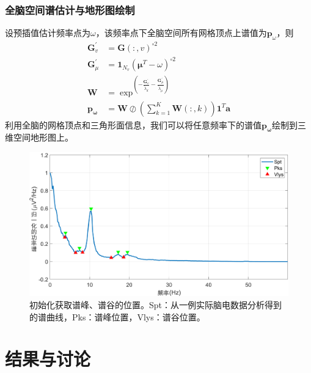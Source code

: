 \subsubsection{全脑空间谱估计与地形图绘制}
设预插值估计频率点为$\omega$，该频率点下全脑空间所有网格顶点上谱值为$\mathbf{p}_\omega$，则
\begin{equation}\label{eq7.16}
\begin{aligned}
\mathbf{G}^\prime_v& = \mathbf{G}(:,v)^{\circ2}\\
\mathbf{G}^\prime_\mu& = \mathbf{1}_{N_v}(\mathbf{\mu}^T-\omega)^{\circ2}\\
\mathbf{W}& =\exp^{(-\frac{\mathbf{G}^\prime_v}{\tilde{\lambda}_d}-\frac{\mathbf{G}^\prime_\mu}{\tilde{\lambda}_\mu})}\\
\mathbf{p_\omega}& =\mathbf{W}\oslash{(\sum_{k=1}^K\mathbf{W}(:,k))\mathbf{1}^T}\mathbf{a}
\end{aligned}
\end{equation}
利用全脑的网格顶点和三角形面信息，我们可以将任意频率下的谱值$\mathbf{p_\omega}$绘制到三维空间地形图上。
\begin{figure}[!h]
	\includegraphics[width=15cm]{pic/xipi/detect.png}
	\caption{初始化获取谱峰、谱谷的位置。Spt：从一例实际脑电数据分析得到的谱曲线，Pks：谱峰位置，Vlys：谱谷位置。}
	\label{7:detect}
\end{figure}

\section{结果与讨论}
